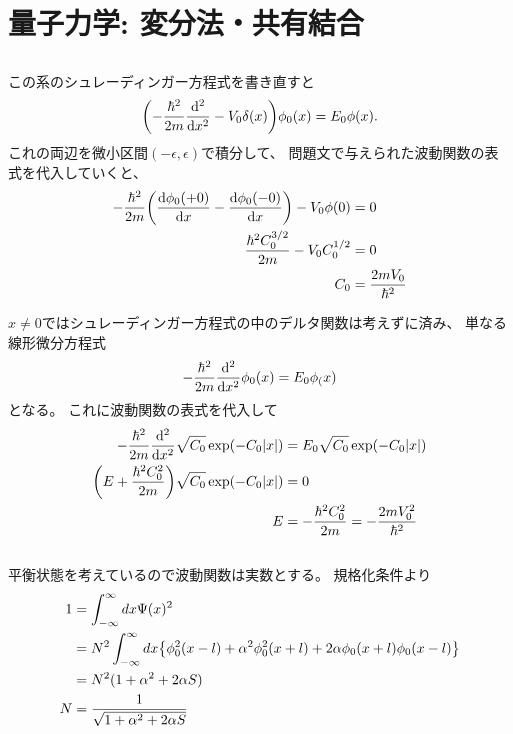 \documentclass[../../master.tex]{subfiles}
\begin{document}
\chapter{量子力学: 変分法・共有結合}
\section{}
この系のシュレーディンガー方程式を書き直すと
\begin{equation}\begin{aligned}[b]
    \qty(-\frac{\hbar^2}{2m}\dv[2]{x}-V_0\delta(x))\phi_0(x)=E_0\phi(x).
\end{aligned}\end{equation}
これの両辺を微小区間\((-\epsilon,\epsilon)\)で積分して、
問題文で与えられた波動関数の表式を代入していくと、
\begin{equation}\begin{aligned}[b]
    -\frac{\hbar^2}{2m}\qty(\dv{\phi_0(+0)}{x}-\dv{\phi_0(-0)}{x})-V_0\phi(0)&=0\\
    \frac{\hbar^2C_0^{3/2}}{2m}-V_0C_0^{1/2}&=0\\
    C_0 &= \frac{2mV_0}{\hbar^2}
\end{aligned}\end{equation}

\(x\neq0\)ではシュレーディンガー方程式の中のデルタ関数は考えずに済み、
単なる線形微分方程式
\begin{equation}\begin{aligned}[b]
    -\frac{\hbar^2}{2m}\dv[2]{x}\phi_0(x)=E_0\phi_(x)
\end{aligned}\end{equation}
となる。
これに波動関数の表式を代入して
\begin{equation}\begin{aligned}[b]
    -\frac{\hbar^2}{2m}\dv[2]{x}\sqrt{C_0}\exp(-C_0\abs{x})&=E_0\sqrt{C_0}\exp(-C_0\abs{x})\\
    \qty(E+\frac{\hbar^2C_0^2}{2m})\sqrt{C_0}\exp(-C_0\abs{x}) &=0\\
    E &= -\frac{\hbar^2C_0^2}{2m}=-\frac{2mV_0^2}{\hbar^2}
\end{aligned}\end{equation}

\section{}
平衡状態を考えているので波動関数は実数とする。
規格化条件より
\begin{equation}\begin{aligned}[b]
    1 &= \int_{-\infty}^\infty dx\Psi(x)^2\\
    &=N^2\int_{-\infty}^{\infty}dx\qty{\phi_0^2(x-l)+\alpha^2\phi_0^2(x+l)+2\alpha\phi_0(x+l)\phi_0(x-l)}\\
    &=N^2(1+\alpha^2+2\alpha S)\\
    N &= \frac{1}{\sqrt{1+\alpha^2+2\alpha S}}
\end{aligned}\end{equation}
\end{document}
